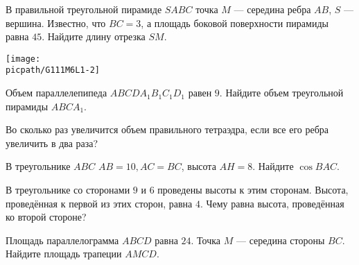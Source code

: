 \begin{class}[number=1]
\begin{listofex}
		\item 
		\begin{minipage}[t]{\bodywidth}
			В правильной треугольной пирамиде \(SABC\) точка \(M\) --- середина ребра \(AB\), \(S\) --- вершина. Известно, что \(BC = 3\), а площадь боковой поверхности пирамиды равна \(45\). Найдите длину отрезка \(SM\).
		\end{minipage}
		\hspace{0.02\linewidth}
		\begin{minipage}[t]{\picwidth}
			\texttt{[image: \\picpath/G111M6L1-2]}
		\end{minipage}
		\item Объем параллелепипеда \(ABCDA_1B_1C_1D_1\) равен \(9\). Найдите объем треугольной пирамиды \(ABCA_1\).
		\item Во сколько раз увеличится объем правильного тетраэдра, если все его ребра увеличить в два раза?
		\item В треугольнике \(ABC\) \(AB = 10, AC = BC\), высота \(AH = 8\). Найдите \(\cos{BAC}\).
		\item В треугольнике со сторонами \(9\) и \(6\) проведены высоты к этим сторонам. Высота, проведённая к первой из этих сторон, равна \(4\). Чему равна высота, проведённая ко второй стороне?
		\item Площадь параллелограмма \(ABCD\) равна \(24\). Точка \(M\) --- середина стороны \(BC\). Найдите площадь трапеции \(AMCD\).
	\end{listofex}
\end{class}

